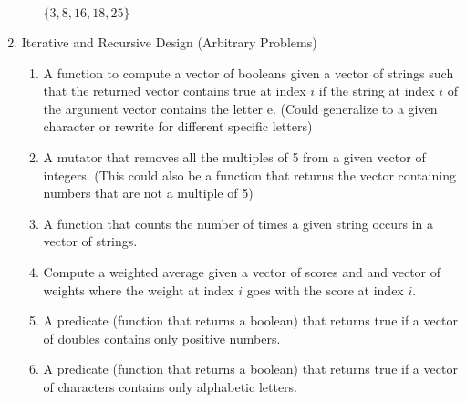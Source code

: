 \documentclass[nobib]{tufte-handout}
\begin{document}
\begin{enumerate}
\begin{enumerate}
  \( \{3,8,16,18,25 \} \)
\end{enumerate}
\item Iterative and Recursive Design (Arbitrary Problems)
\begin{enumerate}
  \item A function to compute a vector of booleans given a vector of strings such that the returned vector contains true at index \( i \) if the string at index \(i\) of the argument vector contains the letter e. (Could generalize to a given character or rewrite for different specific letters)
  \item A mutator that removes all the multiples of 5 from a given vector of integers. (This could also be a function that returns the vector containing numbers that are not a multiple of 5)
  \item A function that counts the number of times a given string occurs in a vector of strings.
  \item Compute a weighted average given a vector of scores and and vector of weights where the weight at index \(i\) goes with the score at index \(i\).
  \item A predicate (function that returns a boolean) that returns true if a vector of doubles contains only positive numbers.
  \item A predicate (function that returns a boolean) that returns true if a vector of characters contains only alphabetic letters.
\end{enumerate}

\end{enumerate}
\end{document}
